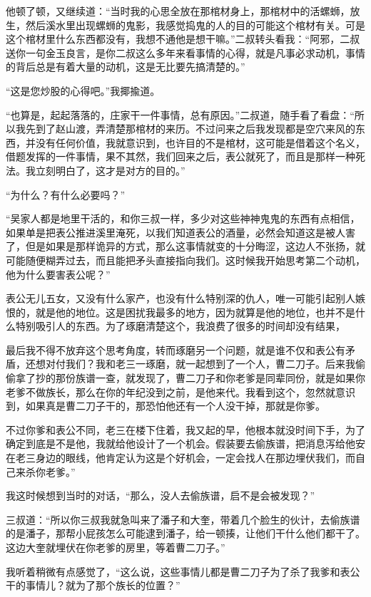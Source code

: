 他顿了顿，又继续道：“当时我的心思全放在那棺材身上，那棺材中的活螺蛳，放生，然后溪水里出现螺蛳的鬼影，我感觉捣鬼的人的目的可能这个棺材有关。可是这个棺材里什么东西都没有，我想不通他是想干嘛。”二叔转头看我：“阿邪，二叔送你一句金玉良言，是你二叔这么多年来看事情的心得，就是凡事必求动机，事情的背后总是有着大量的动机，这是无比要先搞清楚的。”

“这是您炒股的心得吧。”我揶揄道。

“也算是，起起落落的，庄家干一件事情，总有原因。”二叔道，随手看了看盘：“所以我先到了赵山渡，弄清楚那棺材的来历。不过问来之后我发现都是空穴来风的东西，并没有任何价值，我就意识到，也许目的不是棺材，这可能是借着这个名义，借题发挥的一件事情，果不其然，我们回来之后，表公就死了，而且是那样一种死法。我立刻明白了，这才是对方的目的。”

“为什么？有什么必要吗？”

“吴家人都是地里干活的，和你三叔一样，多少对这些神神鬼鬼的东西有点相信，如果单是把表公推进溪里淹死，以我们知道表公的酒量，必然会知道这是被人害了，但是如果是那样诡异的方式，那么这事情就变的十分晦涩，这边人不张扬，就可能随便糊弄过去，而且能把矛头直接指向我们。这时候我开始思考第二个动机，他为什么要害表公呢？”

表公无儿五女，又没有什么家产，也没有什么特别深的仇人，唯一可能引起别人嫉恨的，就是他的地位。这是困扰我最多的地方，因为就算是他的地位，也并不是什么特别吸引人的东西。为了琢磨清楚这个，我浪费了很多的时间却没有结果，

最后我不得不放弃这个思考角度，转而琢磨另一个问题，就是谁不仅和表公有矛盾，还想对付我们？我和老三一琢磨，就一起想到了一个人，曹二刀子。后来我偷偷拿了抄的那份族谱一查，就发现了，曹二刀子和你老爹是同辈同份，就是如果你老爹不做族长，那么在你的年纪没到之前，是他来代。我看到这个，忽然就意识到，如果真是曹二刀子干的，那恐怕他还有一个人没干掉，那就是你爹。

不过你爹和表公不同，老三在楼下住着，我又起的早，他根本就没时间下手，为了确定到底是不是他，我就给他设计了一个机会。假装要去偷族谱，把消息泻给他安在老三身边的眼线，他肯定认为这是个好机会，一定会找人在那边埋伏我们，而自己来杀你老爹。”

我这时候想到当时的对话，“那么，没人去偷族谱，启不是会被发现？”

三叔道：“所以你三叔我就急叫来了潘子和大奎，带着几个脸生的伙计，去偷族谱的是潘子，那帮小屁孩怎么可能逮到潘子，给一顿揍，让他们干什么他们都干了。这边大奎就埋伏在你老爹的房里，等着曹二刀子。”

我听着稍微有点感觉了，“这么说，这些事情儿都是曹二刀子为了杀了我爹和表公干的事情儿？就为了那个族长的位置？”

